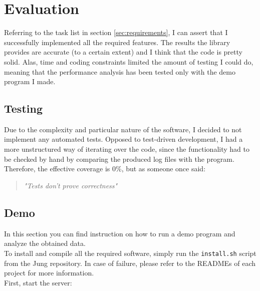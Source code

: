 \chapter{Evaluation}


    Referring to the task list in section \ref{sec:requirements}, I can assert that I successfully implemented
    all the required features. The results the library provides are accurate (to a certain extent) and I think
    that the code is pretty solid. Alas, time and coding constraints limited the amount of testing I could do,
    meaning that the performance analysis has been tested only with the demo program I made.


    \section{Testing}

        Due to the complexity and particular nature of the software, I decided to not implement any automated
        tests. Opposed to test-driven development, I had a more unstructured way of iterating over the code,
        since the functionality had to be checked by hand by comparing the produced log files with the program.
        Therefore, the effective coverage is 0\%, but as someone once said:\\

        \begin{quote} 
            \centering 
            \textit{"Tests don't prove correctness"}
        \end{quote}


    \section{Demo}

        In this section you can find instruction on how to run a demo program and analyze the obtained data.\\

        To install and compile all the required software, simply run the \texttt{install.sh} script from the Jung repository.
        In case of failure, please refer to the READMEs of each project for more information.\\

        First, start the server:\\

